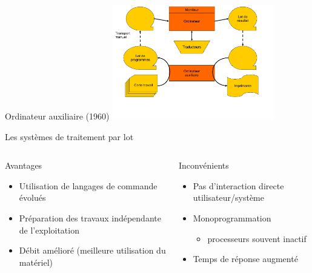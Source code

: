 \begin{frame}{Ordinateur auxiliaire (1960)}
\includegraphics[height=5cm]{../illustration/ordinateur_aux.pdf}
\end{frame}

\begin{frame}{Les systèmes de traitement par lot}
\begin{columns}
\begin{block}{Avantages}
\begin{itemize}
\item Utilisation de langages de commande évolués
\item Préparation des travaux indépendante de l’exploitation
\item Débit amélioré (meilleure utilisation du matériel)
\end{itemize}
\end{block}
\begin{block}{Inconvénients}
\begin{itemize}
\item Pas d'interaction directe utilisateur/système
\item Monoprogrammation
\begin{itemize}
\item processeurs souvent inactif
\end{itemize}
\item Temps de réponse augmenté
\end{itemize}
\end{block}
\end{columns}
\end{frame}

